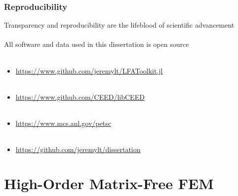 \documentclass{beamer}
\begin{document}
\begin{frame}
\begin{center}
\frametitle{Reproducibility}

Transparency and reproducibility are the lifeblood of scientific advancement\\

~\\

All software and data used in this dissertation is open source\\

~\\

\begin{itemize}

\item \href{https://www.github.com/jeremylt/LFAToolkit.jl}{https://www.github.com/jeremylt/LFAToolkit.jl}\\

~\\

\item \href{https://www.github.com/CEED/libCEED}{https://www.github.com/CEED/libCEED}\\

~\\

\item \href{https://www.mcs.anl.gov/petsc}{https://www.mcs.anl.gov/petsc}\\

~\\

\item \href{https://github.com/jeremylt/dissertation}{https://github.com/jeremylt/dissertation}\\

\end{itemize}

\end{center}
\end{frame}

\section{High-Order Matrix-Free FEM}
\end{document}
